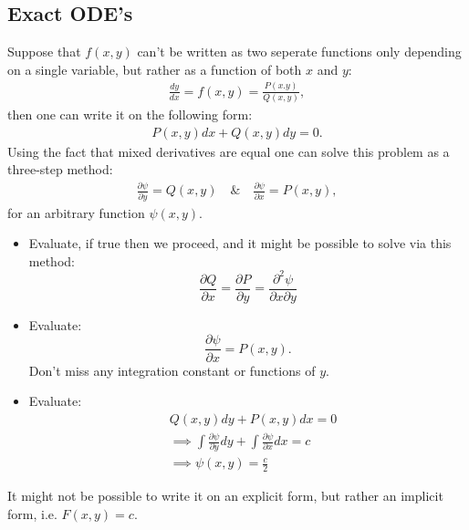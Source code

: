 \documentclass[12pt]{article}
\begin{document}
\subsection{Exact ODE's}
Suppose that $f(x,y)$ can't be written as two seperate functions only depending on a single variable, but rather as a function of both $x$ and $y$:
\begin{align*}
    \frac{dy}{dx} = f(x,y) = \frac{P(x.y)}{Q(x,y)},
\end{align*}then one can write it on the following form:
\begin{align*}
    P(x,y)dx + Q(x,y)dy = 0.
\end{align*}Using the fact that mixed derivatives are equal one can solve this problem as a three-step method:
\begin{align*}
    \frac{\partial \psi}{\partial y} = Q(x,y) \quad \& \quad \frac{\partial \psi}{\partial x} = P(x,y),
\end{align*}for an arbitrary function $\psi(x,y)$.
\begin{itemize}
    \item Evaluate, if true then we proceed, and it might be possible to solve via this method: $$\frac{\partial Q}{\partial x} = \frac{\partial P}{\partial y} = \frac{\partial^2 \psi}{\partial x\partial y}$$
    \item Evaluate: $$\frac{\partial \psi}{\partial x} = P(x,y).$$ Don't miss any integration constant or functions of $y$.
    \item Evaluate: \begin{align*}
        &Q(x,y)dy + P(x,y)dx = 0\\
        &\implies \int \frac{\partial \psi}{\partial y}dy + \int \frac{\partial \psi}{\partial x}dx = c\\
        &\implies \psi(x,y) = \frac{c}{2}
    \end{align*}
\end{itemize}It might not be possible to write it on an explicit form, but rather an implicit form, i.e. $F(x,y) = c$.
\end{document}
